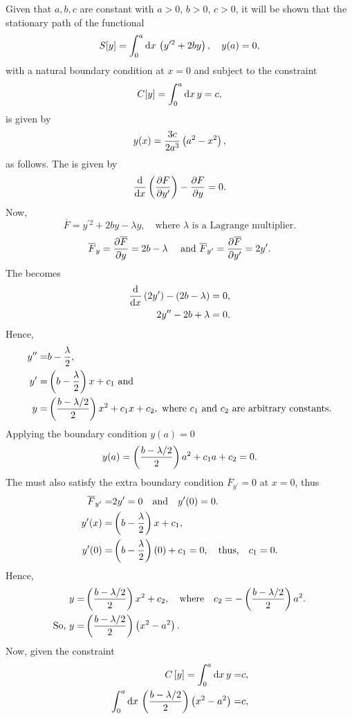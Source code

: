 \begin{question}
Given that $a, b, c$ are constant with $a > 0$, $b > 0$, $c > 0$, it will be shown that the stationary path of the functional
\[
	S[y] = \int_{0}^{a}\mathrm{d} x\, \left(y^{\prime 2} + 2b y\right),\quad y(a) = 0,
\]
with a natural boundary condition at $x = 0$ and subject to the constraint
\[
	C[y] = \int_{0}^{a}\mathrm{d} x\, y = c,
\]
is given by
\[
	y(x) = \frac{3c}{2a^3}\left(a^2-x^2\right),
\]
as follows.
The \el is given by
\[
	\frac{\mathrm{d}}{\mathrm{d}x}\left(\frac{\partial F}{\partial y^\prime}\right)-\frac{\partial F}{\partial y} = 0.
\]
Now, 
\[
	\overline{F} = y^{\prime 2} + 2b y -\lambda y,\quad\text{where } \lambda\text{ is a Lagrange multiplier.}
\]
\[
	\overline{F}_y = \frac{\partial \overline{F}}{\partial y} =2b -\lambda\quad\text{ and } \overline{F}_{y^\prime} = \frac{\partial \overline{F}}{\partial y^\prime} = 2y^\prime.
\]
The \el becomes
\begin{align*}
 	\frac{\mathrm{d}}{\mathrm{d}x}\left(2y^\prime\right)-\left(2b-\lambda\right) = 0,\\
 	2y^{\prime\prime} - 2b + \lambda = 0.
\end{align*}
Hence,
\begin{align*}
	y^{\prime\prime}=& b-\dfrac{\lambda}{2},\\
	y^{\prime}=& \left(b-\dfrac{\lambda}{2}\right) x+c_1 \text{ and}\\
	y=& \left(\dfrac{b-\lambda/2}{2}\right) x^2 + c_1x + c_2, \text{ where  $c_1$ and $c_2$ are arbitrary constants}. 
\end{align*}  
Applying the boundary condition $y(a)=0$
 \[
 	y(a)=\left(\dfrac{b-\lambda/2}{2}\right) a^2 + c_1a + c_2=0.
 \]
 The \el must also satisfy the extra boundary condition $\overline{F}_{y^\prime}=0$ at $x=0$, thus
 \begin{align*}
 	\overline{F}_{y^\prime} =& 2y^\prime = 0\quad\text{and}\quad y^\prime(0) = 0.\\
 	y^\prime(x) =& \left(b-\frac{\lambda}{2}\right) x + c_1,\\
 	y^\prime(0) =& \left(b-\frac{\lambda}{2}\right)(0) + c_1=0,\quad\text{thus,}\quad c_1=0.\\
 \end{align*}
Hence,
\begin{align*}
 	y=& \left(\dfrac{b-\lambda/2}{2}\right) x^2 + c_2, \quad\text{where}\quad c_2 =-\left(\dfrac{b-\lambda/2}{2}\right) a^2.\\
 	\text{So, } y=& \left(\dfrac{b-\lambda/2}{2}\right)\left(x^2-a^2\right).
\end{align*}
Now, given the constraint
\begin{align*}
	C\lrs{y} = \Int{0}{a}{x} y =& c,\\
\Int{0}{a}{x}\lr{\dfrac{b-\lambda/2}{2}}\lr{x^2-a^2} =& c,\\

\end{align*}
\end{question}
